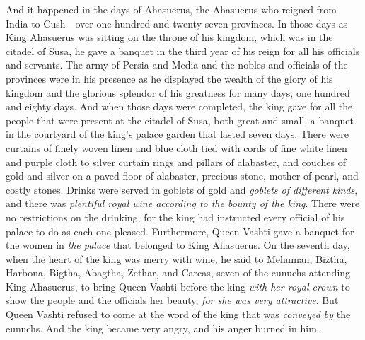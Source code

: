 
\begin{biblechapter} %
 And it happened in the days of Ahasuerus, the Ahasuerus who reigned from India to Cush—over one hundred and twenty-seven provinces.
\verse In those days as King Ahasuerus was sitting on the throne of his kingdom, which was in the citadel of Susa,
\verse he gave a banquet in the third year of his reign for all his officials and servants. The army of Persia and Media and the nobles and officials of the provinces were in his presence
\verse as he displayed the wealth of the glory of his kingdom and the glorious splendor of his greatness for many days, one hundred and eighty days.
\verse And when those days were completed, the king gave for all the people that were present at the citadel of Susa, both great and small, a banquet in the courtyard of the king’s palace garden that lasted seven days.
\verse There were curtains of finely woven linen and blue cloth tied with cords of fine white linen and purple cloth to silver curtain rings and pillars of alabaster, and couches of gold and silver on a paved floor of alabaster, precious stone, mother-of-pearl, and costly stones.
\verse Drinks were served in goblets of gold and \textit{goblets of different kinds}, and there was \textit{plentiful royal wine according to the bounty of the king}.
\verse There were no restrictions on the drinking, for the king had instructed every official of his palace to do as each one pleased.
\verse Furthermore, Queen Vashti gave a banquet for the women in \textit{the palace} that belonged to King Ahasuerus.
 On the seventh day, when the heart of the king was merry with wine, he said to Mehuman, Biztha, Harbona, Bigtha, Abagtha, Zethar, and Carcas, seven of the eunuchs attending King Ahasuerus,
\verse to bring Queen Vashti before the king \textit{with her royal crown} to show the people and the officials her beauty, \textit{for she was very attractive}.
\verse But Queen Vashti refused to come at the word of the king that was \textit{conveyed by} the eunuchs. And the king became very angry, and his anger burned in him.

\end{biblechapter}
